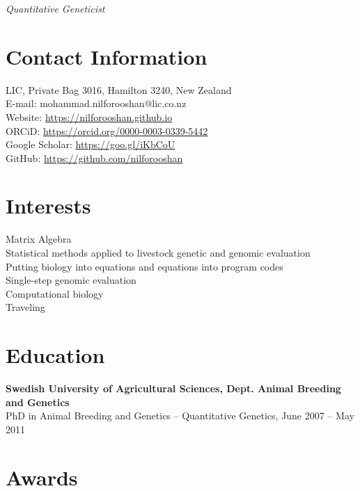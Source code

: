 \documentclass[margin,line]{res}
\begin{document}
 \hfill {\em Quantitative Geneticist}

\begin{resume}
  \section{\sc Contact Information}

  LIC, Private Bag 3016, Hamilton 3240, New Zealand \\
  {E-mail:}  mohammad.nilforooshan@lic.co.nz \\
  {Website:} \url{https://nilforooshan.github.io} \\
  {ORCiD:} \url{https://orcid.org/0000-0003-0339-5442} \\
  {Google Scholar:} \url{https://goo.gl/iKbCoU} \\
  {GitHub:}  \url{https://github.com/nilforooshan}
  \section{\sc Interests}

  Matrix Algebra \\
  Statistical methods applied to livestock genetic and genomic evaluation \\
  Putting biology into equations and equations into program codes \\
  Single-step genomic evaluation \\
  Computational biology \\
  Traveling
  \section{\sc Education}

   {\bf Swedish University of Agricultural Sciences, Dept. Animal Breeding and Genetics} \\
  PhD in Animal Breeding and Genetics -- Quantitative Genetics, June 2007 -- May 2011
  \section{\sc Awards}


\end{resume}
\end{document}
